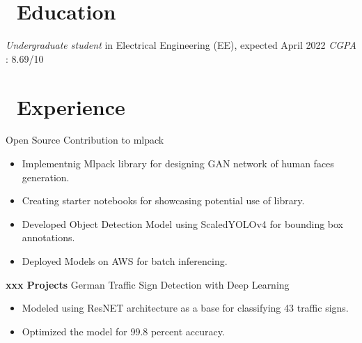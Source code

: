 \documentclass{resume}
\begin{document}



\section{\faGraduationCap\ Education}
\textit{Undergraduate student} in Electrical Engineering (EE), expected April 2022
\textit {CGPA} : 8.69/10


\section{\faUsers\ Experience}
\role{Student Developer}
Open Source Contribution to mlpack
\begin{itemize}
  \item Implementnig Mlpack library for designing GAN network of human faces generation.
  \item Creating starter notebooks for showcasing potential use of library.
\end{itemize}

\begin{itemize}
  \item Developed Object Detection Model using ScaledYOLOv4 for bounding box annotations.
  \item Deployed Models on AWS for batch inferencing.
\end{itemize}

\textbf{xxx Projects}
German Traffic Sign Detection with Deep Learning
\begin{itemize}
  \item Modeled using ResNET architecture as a base for classifying 43 traffic signs.
  \item Optimized the model for 99.8 percent accuracy.
\end{itemize}
\end{document}
